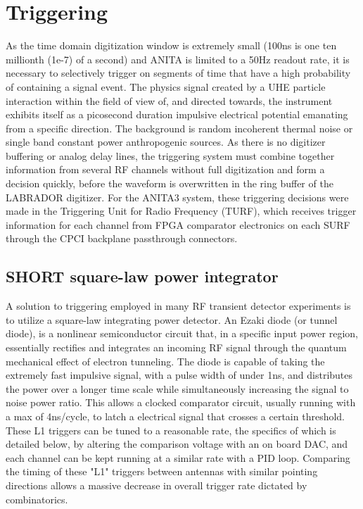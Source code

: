 		
\section{Triggering}
	As the time domain digitization window is extremely small (100ns is one ten millionth (1e-7) of a second) and ANITA is limited to a 50Hz readout rate, it is necessary to selectively trigger on segments of time that have a high probability of containing a signal event.  The physics signal created by a UHE particle interaction within the field of view of, and directed towards, the instrument exhibits itself as a picosecond duration impulsive electrical potential emanating from a specific direction.  The background is random incoherent thermal noise or single band constant power anthropogenic sources.  As there is no digitizer buffering or analog delay lines, the triggering system must combine together information from several RF channels without full digitization and form a decision quickly, before the waveform is overwritten in the ring buffer of the LABRADOR digitizer.  For the ANITA3 system, these triggering decisions were made in the Triggering Unit for Radio Frequency (TURF), which receives trigger information for each channel from FPGA comparator electronics on each SURF through the CPCI backplane passthrough connectors.
	
	\subsection{SHORT square-law power integrator}
		A solution to triggering employed in many RF transient detector experiments is to utilize a square-law integrating power detector.  An Ezaki diode (or tunnel diode), is a nonlinear semiconductor circuit that, in a specific input power region, essentially rectifies and integrates an incoming RF signal through the quantum mechanical effect of electron tunneling.  The diode is capable of taking the extremely fast impulsive signal, with a pulse width of under 1ns, and distributes the power over a longer time scale while simultaneously increasing the signal to noise power ratio.  This allows a clocked comparator circuit, usually running with a max of 4ns/cycle, to latch a electrical signal that crosses a certain threshold.  These L1 triggers can be tuned to a reasonable rate, the specifics of which is detailed below, by altering the comparison voltage with an on board DAC, and each channel can be kept running at a similar rate with a PID loop.  Comparing the timing of these "L1" triggers between antennas with similar pointing directions allows a massive decrease in overall trigger rate dictated by combinatorics.
		
